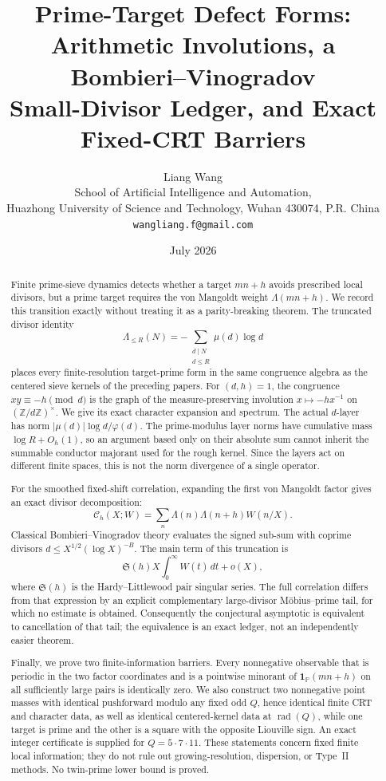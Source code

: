 \documentclass[11pt]{article}
\title{\textbf{Prime-Target Defect Forms:}\\
\textbf{Arithmetic Involutions, a Bombieri--Vinogradov}\\
\textbf{Small-Divisor Ledger, and Exact Fixed-CRT Barriers}}
\author{Liang Wang\\
\small School of Artificial Intelligence and Automation,\\[-0.2em]
\small Huazhong University of Science and Technology, Wuhan 430074, P.R. China\\
\small \texttt{wangliang.f@gmail.com}}
\date{July 2026}
\theoremstyle{definition}
\theoremstyle{remark}
\newcommand{\Pp}{\mathbb P}
\newcommand{\Z}{\mathbb Z}
\newcommand{\one}{\mathbf 1}
\newcommand{\cC}{\mathcal C}
\begin{document}
\maketitle

\begin{abstract}
Finite prime-sieve dynamics detects whether a target $mn+h$ avoids prescribed local divisors, but a prime target requires the von Mangoldt weight $\Lambda(mn+h)$.  We record this transition exactly without treating it as a parity-breaking theorem.  The truncated divisor identity
\[
 \Lambda_{\le R}(N)=-\sum_{\substack{d\mid N\\d\le R}}\mu(d)\log d
\]
places every finite-resolution target-prime form in the same congruence algebra as the centered sieve kernels of the preceding papers.  For $(d,h)=1$, the congruence $xy\equiv-h\pmod d$ is the graph of the measure-preserving involution $x\mapsto-hx^{-1}$ on $(\Z/d\Z)^\times$.  We give its exact character expansion and spectrum.  The actual $d$-layer has norm $|\mu(d)|\log d/\varphi(d)$.  The prime-modulus layer norms have cumulative mass $\log R+O_h(1)$, so an argument based only on their absolute sum cannot inherit the summable conductor majorant used for the rough kernel.  Since the layers act on different finite spaces, this is not the norm divergence of a single operator.

For the smoothed fixed-shift correlation, expanding the first von Mangoldt factor gives an exact divisor decomposition:
\[
 \cC_h(X;W)=\sum_n\Lambda(n)\Lambda(n+h)W(n/X).
\]
Classical Bombieri--Vinogradov theory evaluates the signed sub-sum with coprime divisors $d\le X^{1/2}(\log X)^{-B}$.  The main term of this truncation is
\[
 \mathfrak S(h)X\int_0^\infty W(t)\,dt+o(X),
\]
where $\mathfrak S(h)$ is the Hardy--Littlewood pair singular series.  The full correlation differs from that expression by an explicit complementary large-divisor M\"obius--prime tail, for which no estimate is obtained.  Consequently the conjectural asymptotic is equivalent to cancellation of that tail; the equivalence is an exact ledger, not an independently easier theorem.

Finally, we prove two finite-information barriers.  Every nonnegative observable that is periodic in the two factor coordinates and is a pointwise minorant of $\one_{\Pp}(mn+h)$ on all sufficiently large pairs is identically zero.  We also construct two nonnegative point masses with identical pushforward modulo any fixed odd $Q$, hence identical finite CRT and character data, as well as identical centered-kernel data at $\operatorname{rad}(Q)$, while one target is prime and the other is a square with the opposite Liouville sign.  An exact integer certificate is supplied for $Q=5\cdot7\cdot11$.  These statements concern fixed finite local information; they do not rule out growing-resolution, dispersion, or Type~II methods.  No twin-prime lower bound is proved.
\end{abstract}
\end{document}
